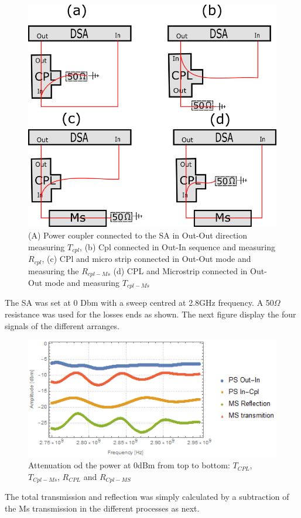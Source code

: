 \begin{figure}[hb]
	\centering
	\includegraphics[width=0.7\linewidth]{../figures/APD}
	\caption[Diferent arranges of the CPL and MicroStrip conected to the DSA]{(A) Power coupler connected to the SA in Out-Out direction measuring $T_{cpl}$, (b) Cpl connected in Out-In sequence and measuring $R_{cpl}$, (c) CPl and micro strip connected in Out-Out mode and measuring the $R_{cpl-Ms}$ (d) CPL and Microstrip connected in Out-Out mode and measuring $T_{cpl-Ms}$}
	\label{fig:apd}
\end{figure}

The SA was set at 0 Dbm with a sweep centred at 2.8GHz frequency. A 50$\Omega$ resistance was used for the losses ends as shown. The next figure display the four signals of the different arranges.

\begin{figure}
	\centering
	\includegraphics[width=0.7\linewidth]{../figures/microstrip}
	\caption{Attenuation od the power at 0dBm from top to bottom: $T_{CPL}$,$T_{Cpl-Ms}$, $R_{CPL}$ and $R_{Cpl-MS}$}
	\label{fig:microstrip}
	\end{figure}

The total transmission and reflection was simply calculated by a subtraction of the Ms transmission in the different processes as next.

